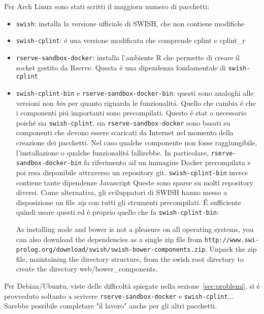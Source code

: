 \documentclass[10pt,titlepage,twoside,a4paper]{report}
\begin{document}
Per Arch Linux sono stati scritti il maggiorn numero di pacchetti:
\begin{itemize}
    \item \texttt{swish}: installa la versione ufficiale di SWISH, che non 
contiene modifiche
    \item \texttt{swish-cplint}: \'e una versione modificata che comprende 
cplint e cplint\_r
    \item \texttt{rserve-sandbox-docker}: installa l'ambiente R che permette di 
creare il socket gestito da Rserve. Questa \'e una dipendenza fondamentale di 
\texttt{swish-cplint}
    \item \texttt{swish-cplint-bin} e \texttt{rserve-sandbox-docker-bin}: 
questi sono analoghi alle versioni non \emph{bin} per quanto riguarda le 
funzionalit\'a. Quello che cambia \'e che i componenti pi\'u importanti sono 
precompilati. Questo \'e stat o necessario poich\'e sia \texttt{swish-cplint}, 
sia \texttt{rserve-sandbox-docker} sono basati su componenti che devono essere 
scaricati da Internet nel momento della creazione dei pacchetti. Nel caso 
qualche componente non fosse raggiungibile, l'installazione o qualche 
funzionalit\'a fallirebbe. In particolare, \texttt{rserve-sandbox-docker-bin} 
fa riferimento ad un immagine Docker precompilata e poi resa disponibile 
attraverso un repository git. \texttt{swish-cplint-bin} invece contiene tante 
dipendenze Javascript\cite{javascriptDepsSWISH} Queste sono sparse su molti 
repository diversi. Come alternativa, gli sviluppatori 
di SWISH hanno messo a disposizione un file \emph{zip}\cite{SWISHwebDepsZip} 
con tutti gli strumenti precompilati. \'E sufficiente quindi usare questi ed 
\'e proprio quello che fa \texttt{swish-cplint-bin}:
\begin{displayquote}
As installing node and bower is not a pleasure on all operating systems,
you can also download  the  dependencies  as   a  single  zip  file from
\texttt{http://www.swi-prolog.org/download/swish/swish-bower-components.zip}.
Unpack the zip file, maintaining the directory structure, from the swish
root directory to create the directory web/bower\_components.
\end{displayquote}
\end{itemize}

Per Debian/Ubuntu, viste delle difficolt\'a spiegate nella 
sezione~\ref{sec:problemi}, si \'e provveduto soltanto a scrivere 
\texttt{rserve-sandbox-docker} e \texttt{swish-cplint}... Sarebbe possibile 
completare "il lavoro" anche per gli altri pacchetti.
\end{document}
